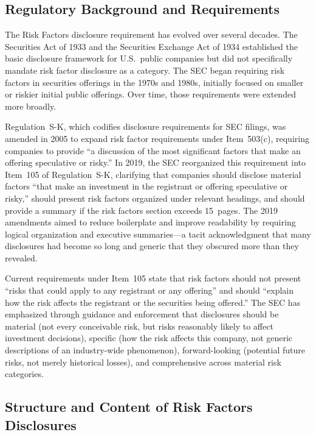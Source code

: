 \documentclass[11pt,openany]{book}
\begin{document}
\subsection{Regulatory Background and Requirements}
\label{subsec:regulatory-background}

The Risk Factors disclosure requirement has evolved over several decades. The Securities Act of 1933 and the Securities Exchange Act of 1934 established the basic disclosure framework for U.S.\ public companies but did not specifically mandate risk factor disclosure as a category. The SEC began requiring risk factors in securities offerings in the 1970s and 1980s, initially focused on smaller or riskier initial public offerings. Over time, those requirements were extended more broadly.

Regulation~S-K, which codifies disclosure requirements for SEC filings, was amended in 2005 to expand risk factor requirements under Item~503(c), requiring companies to provide ``a discussion of the most significant factors that make an offering speculative or risky.'' In 2019, the SEC reorganized this requirement into Item~105 of Regulation~S-K, clarifying that companies should disclose material factors ``that make an investment in the registrant or offering speculative or risky,'' should present risk factors organized under relevant headings, and should provide a summary if the risk factors section exceeds 15~pages. The 2019 amendments aimed to reduce boilerplate and improve readability by requiring logical organization and executive summaries---a tacit acknowledgment that many disclosures had become so long and generic that they obscured more than they revealed.

Current requirements under Item~105 state that risk factors should not present ``risks that could apply to any registrant or any offering'' and should ``explain how the risk affects the registrant or the securities being offered.'' The SEC has emphasized through guidance and enforcement that disclosures should be material (not every conceivable risk, but risks reasonably likely to affect investment decisions), specific (how the risk affects this company, not generic descriptions of an industry-wide phenomenon), forward-looking (potential future risks, not merely historical losses), and comprehensive across material risk categories.

\subsection{Structure and Content of Risk Factors Disclosures}
\label{subsec:structure-and-content}
\end{document}
